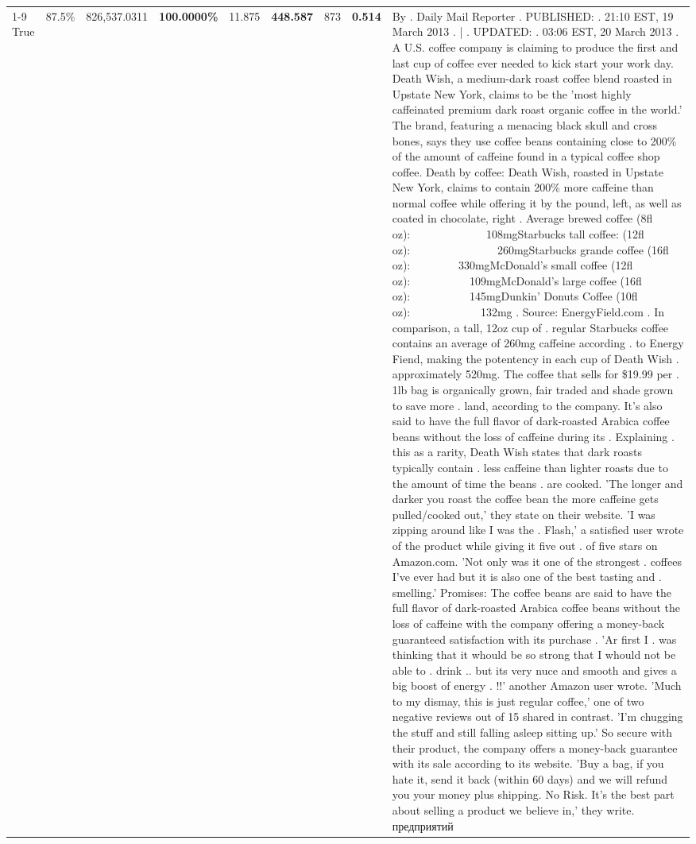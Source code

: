 \begin{table}[H]
{\begin{tabular}{lllrlllll}
\cline{1-9}
True & 87.5\% & 826,537.0311 & \bfseries \color{red} 100.0000\% & 11.875 & \bfseries \color{red} 448.587 & 873 & \bfseries \color{red} 0.514 & By . Daily Mail Reporter . PUBLISHED: . 21:10 EST, 19 March 2013 . | . UPDATED: . 03:06 EST, 20 March 2013 . A U.S. coffee company is claiming to produce the first and last cup of coffee ever needed to kick start your work day. Death Wish, a medium-dark roast coffee blend roasted in Upstate New York, claims to be the 'most highly caffeinated premium dark roast organic coffee in the world.' The brand, featuring a menacing black skull and cross bones, says they use coffee beans containing close to 200\% of the amount of caffeine found in a typical coffee shop coffee. Death by coffee: Death Wish, roasted in Upstate New York, claims to contain 200\% more caffeine than normal coffee while offering it by the pound, left, as well as coated in chocolate, right . Average brewed coffee (8fl oz):              108mgStarbucks tall coffee: (12fl oz):                260mgStarbucks grande coffee (16fl oz):         330mgMcDonald's small coffee (12fl oz):           109mgMcDonald's large coffee (16fl oz):           145mgDunkin' Donuts Coffee (10fl oz):             132mg . Source: EnergyField.com . In comparison, a tall, 12oz cup of . regular Starbucks coffee contains an average of 260mg caffeine according . to Energy Fiend, making the potentency in each cup of Death Wish . approximately 520mg. The coffee that sells for \$19.99 per . 1lb bag is organically grown, fair traded and shade grown to save more . land, according to the company. It's also said to have the full flavor of dark-roasted Arabica coffee beans without the loss of caffeine during its . Explaining . this as a rarity, Death Wish states that dark roasts typically contain . less caffeine than lighter roasts due to the amount of time the beans . are cooked. 'The longer and darker you roast the coffee bean the more caffeine gets pulled/cooked out,' they state on their website. 'I was zipping around like I was the . Flash,' a satisfied user wrote of the product while giving it five out . of five stars on Amazon.com. 'Not only was it one of the strongest . coffees I've ever had but it is also one of the best tasting and . smelling.’ Promises: The coffee beans are said to have the full flavor of dark-roasted Arabica coffee beans without the loss of caffeine with the company offering a money-back guaranteed satisfaction with its purchase . 'Ar first I . was thinking that it whould be so strong that I whould not be able to . drink .. but its very nuce and smooth and gives a big boost of energy . !!' another Amazon user wrote. 'Much to my dismay, this is just regular coffee,' one of two negative reviews out of 15 shared in contrast. 'I'm chugging the stuff and still falling asleep sitting up.' So secure with their product, the company offers a money-back guarantee with its sale according to its website. 'Buy a bag, if you hate it, send it back (within 60 days) and we will refund you your money plus shipping. No Risk. It’s the best part about selling a product we believe in,' they write. предприятий \\

\end{tabular}}
\end{table}

